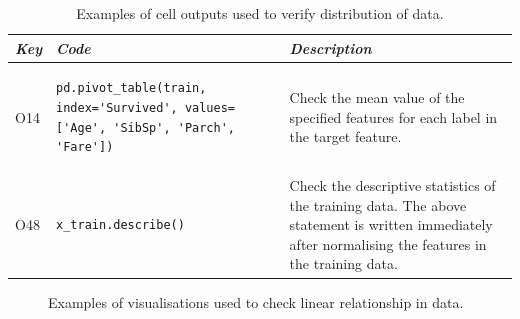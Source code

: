 \begin{table}
\centering
\caption{Examples of cell outputs used to verify distribution of data.}
\begin{tabular}{@{}m{} m{} m{}@{}}
\toprule
\emph{\textbf{Key}}&
\emph{\textbf{Code}}&
\emph{\textbf{Description}}\\
\midrule

O14&
\begin{lstlisting}
pd.pivot_table(train, index='Survived', values=['Age', 'SibSp', 'Parch', 'Fare'])
\end{lstlisting}&
Check the mean value of the specified features for each label in the target feature.\\

O48&
\begin{lstlisting}
x_train.describe()
\end{lstlisting}&
Check the descriptive statistics of the training data. The above statement is written immediately after normalising the features in the training data.\\

\bottomrule
\end{tabular}
\label{tab:distribution-check}
\end{table}

\begin{figure}
\centering
{}
\caption{Examples of visualisations used to check linear relationship in data.}
\label{fig:distribution-check}
\end{figure}

